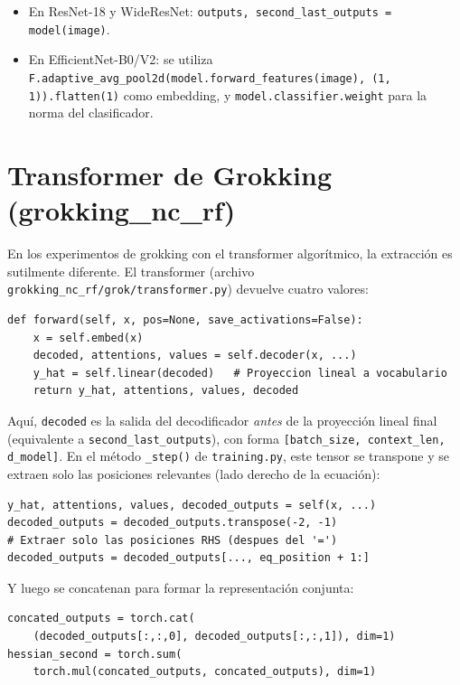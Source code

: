 \documentclass[12pt,a4paper]{report}
\begin{document}
\begin{itemize}
    \item En ResNet-18 y WideResNet: \texttt{outputs, second\_last\_outputs = model(image)}.
    \item En EfficientNet-B0/V2: se utiliza \texttt{F.adaptive\_avg\_pool2d(model.forward\_features(image), (1, 1)).flatten(1)} como embedding, y \texttt{model.classifier.weight} para la norma del clasificador.
\end{itemize}

\section{Transformer de Grokking (grokking\_nc\_rf)}

En los experimentos de grokking con el transformer algorítmico, la extracción es sutilmente diferente. El transformer (archivo \texttt{grokking\_nc\_rf/grok/transformer.py}) devuelve cuatro valores:

\begin{lstlisting}
def forward(self, x, pos=None, save_activations=False):
    x = self.embed(x)
    decoded, attentions, values = self.decoder(x, ...)
    y_hat = self.linear(decoded)   # Proyeccion lineal a vocabulario
    return y_hat, attentions, values, decoded
\end{lstlisting}

Aquí, \texttt{decoded} es la salida del decodificador \emph{antes} de la proyección lineal final (equivalente a \texttt{second\_last\_outputs}), con forma \texttt{[batch\_size, context\_len, d\_model]}. En el método \texttt{\_step()} de \texttt{training.py}, este tensor se transpone y se extraen solo las posiciones relevantes (lado derecho de la ecuación):

\begin{lstlisting}
y_hat, attentions, values, decoded_outputs = self(x, ...)
decoded_outputs = decoded_outputs.transpose(-2, -1)
# Extraer solo las posiciones RHS (despues del '=')
decoded_outputs = decoded_outputs[..., eq_position + 1:]
\end{lstlisting}

Y luego se concatenan para formar la representación conjunta:
\begin{lstlisting}
concated_outputs = torch.cat(
    (decoded_outputs[:,:,0], decoded_outputs[:,:,1]), dim=1)
hessian_second = torch.sum(
    torch.mul(concated_outputs, concated_outputs), dim=1)
\end{lstlisting}
\end{document}
